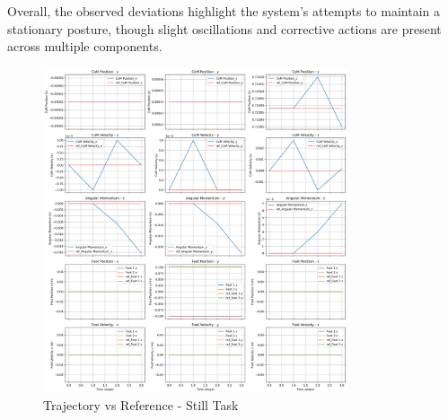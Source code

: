 \documentclass[main.tex]{subfiles}
\begin{document}
Overall, the observed deviations highlight the system's attempts to maintain a stationary posture, though slight oscillations and corrective actions are present across multiple components.
\begin{figure}[htbp]
    \centering
    \includegraphics[width=0.8\textwidth]{figures/contact_x_still.png}
    \caption{Trajectory vs Reference - Still Task}
    \label{fig:yourlabel}
\end{figure}
\begin{table}[H]
    \centering
    \renewcommand{\arraystretch}{1.2}
    \caption{Summary of Forces and Foot Positions per Interval - Still Task}
    \label{tab:data_table}
\end{table}
\end{document}
